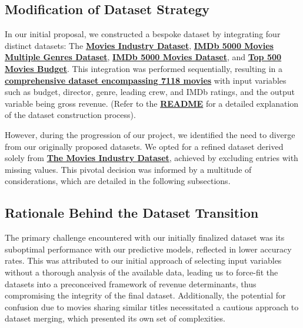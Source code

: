 \documentclass[conference]{IEEEtran}
\begin{document}
     \subsection{Modification of Dataset Strategy}
        In our initial proposal, we constructed a bespoke dataset by integrating four distinct datasets: The \href{https://www.kaggle.com/datasets/danielgrijalvas/movies}{\textbf{Movies Industry Dataset}}, \href{https://www.kaggle.com/datasets/rakkesharv/imdb-5000-movies-multiple-genres-dataset}{\textbf{IMDb 5000 Movies Multiple Genres Dataset}}, \href{https://www.kaggle.com/datasets/carolzhangdc/imdb-5000-movie-dataset}{\textbf{IMDb 5000 Movies Dataset}}, and \href{https://www.kaggle.com/datasets/mitchellharrison/top-500-movies-budget}{\textbf{Top 500 Movies Budget}}. This integration was performed sequentially, resulting in a \href{https://github.com/Vikranth3140/Movie-Revenue-Prediction/blob/main/old%20datasets/final_dataset.csv}{\textbf{comprehensive dataset encompassing 7118 movies}} with input variables such as budget, director, genre, leading crew, and IMDb ratings, and the output variable being gross revenue. (Refer to the \href{https://github.com/Vikranth3140/Movie-Revenue-Prediction/blob/main/old%20datasets/README.md}{\textbf{README}} for a detailed explanation of the dataset construction process).

        However, during the progression of our project, we identified the need to diverge from our originally proposed datasets. We opted for a refined dataset derived solely from \href{https://www.kaggle.com/datasets/danielgrijalvas/movies}{\textbf{The Movies Industry Dataset}}, achieved by excluding entries with missing values. This pivotal decision was informed by a multitude of considerations, which are detailed in the following subsections.

    \subsection{Rationale Behind the Dataset Transition}
        The primary challenge encountered with our initially finalized dataset was its suboptimal performance with our predictive models, reflected in lower accuracy rates. This was attributed to our initial approach of selecting input variables without a thorough analysis of the available data, leading us to force-fit the datasets into a preconceived framework of revenue determinants, thus compromising the integrity of the final dataset. Additionally, the potential for confusion due to movies sharing similar titles necessitated a cautious approach to dataset merging, which presented its own set of complexities.
\end{document}
